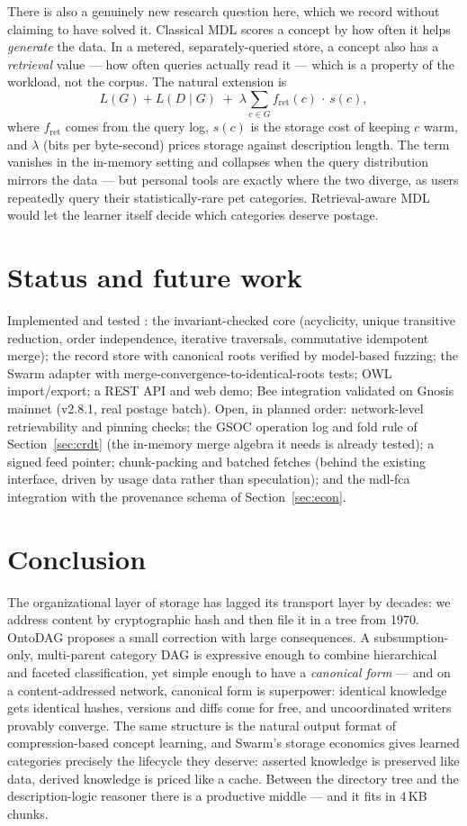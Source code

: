\documentclass[10pt,twocolumn]{article}
\begin{document}
There is also a genuinely new research question here, which we record
without claiming to have solved it. Classical MDL scores a concept by how
often it helps \emph{generate} the data. In a metered, separately-queried
store, a concept also has a \emph{retrieval} value --- how often queries
actually read it --- which is a property of the workload, not the corpus.
The natural extension is
\[
  L(G) + L(D \mid G) \;+\; \lambda \sum_{c \in G}
  f_{\mathrm{ret}}(c)\, \cdot\, s(c),
\]
where $f_{\mathrm{ret}}$ comes from the query log, $s(c)$ is the storage
cost of keeping $c$ warm, and $\lambda$ (bits per byte-second) prices
storage against description length. The term vanishes in the in-memory
setting and collapses when the query distribution mirrors the data --- but
personal tools are exactly where the two diverge, as users repeatedly
query their statistically-rare pet categories. Retrieval-aware MDL would
let the learner itself decide which categories deserve postage.

\section{Status and future work}
\label{sec:status}

Implemented and tested \cite{ontodag}: the invariant-checked core
(acyclicity, unique transitive reduction, order independence, iterative
traversals, commutative idempotent merge); the record store with canonical
roots verified by model-based fuzzing; the Swarm adapter with
merge-convergence-to-identical-roots tests; OWL import/export; a REST API
and web demo; Bee integration validated on Gnosis mainnet (v2.8.1, real
postage batch). Open, in planned order: network-level retrievability and
pinning checks; the GSOC operation log and fold rule of
Section~\ref{sec:crdt} (the in-memory merge algebra it needs is already
tested); a signed feed pointer; chunk-packing and batched fetches (behind
the existing interface, driven by usage data rather than speculation); and
the mdl-fca integration with the provenance schema of
Section~\ref{sec:econ}.

\section{Conclusion}

The organizational layer of storage has lagged its transport layer by
decades: we address content by cryptographic hash and then file it in a
tree from 1970. OntoDAG proposes a small correction with large
consequences. A subsumption-only, multi-parent category DAG is expressive
enough to combine hierarchical and faceted classification, yet simple
enough to have a \emph{canonical form} --- and on a content-addressed
network, canonical form is superpower: identical knowledge gets identical
hashes, versions and diffs come for free, and uncoordinated writers
provably converge. The same structure is the natural output format of
compression-based concept learning, and Swarm's storage economics gives
learned categories precisely the lifecycle they deserve: asserted
knowledge is preserved like data, derived knowledge is priced like a
cache. Between the directory tree and the description-logic reasoner
there is a productive middle --- and it fits in 4\,KB chunks.
\end{document}
